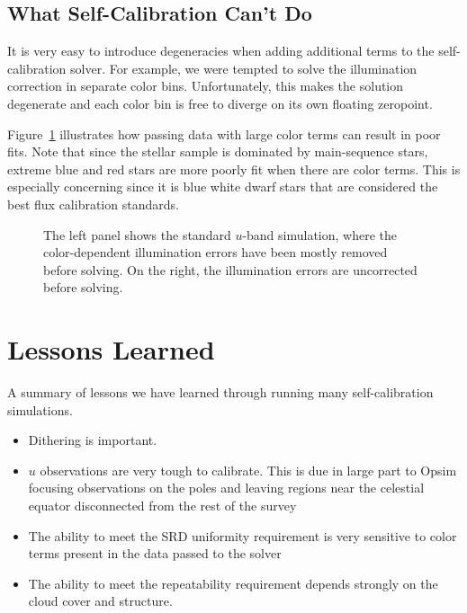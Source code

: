 \documentclass[12pt,preprint]{aastex}
\begin{document}
\subsection{What Self-Calibration Can't Do}

It is very easy to introduce degeneracies when adding additional terms to the self-calibration solver.  For example, we were tempted to solve the illumination correction in separate color bins.  Unfortunately, this makes the solution degenerate and each color bin is free to diverge on its own floating zeropoint.  

Figure~\ref{fig:badcolor} illustrates how passing data with large color terms can result in poor fits.  Note that since the stellar sample is dominated by main-sequence stars, extreme blue and red stars are more poorly fit when there are color terms.  This is especially concerning since it is blue white dwarf stars that are considered the best flux calibration standards.

\begin{figure}
\caption{The left panel shows the standard $u$-band simulation, where the color-dependent illumination errors have been mostly removed before solving.  On the right,  the illumination errors are uncorrected before solving.  \label{fig:badcolor}}
\end{figure}


\section{Lessons Learned}
A summary of lessons we have learned through running many self-calibration simulations.
\begin{itemize}
\item{Dithering is important.  }
\item{$u$ observations are very tough to calibrate.  This is due in large part to Opsim focusing observations on the poles and leaving regions near the celestial equator disconnected from the rest of the survey}
\item{The ability to meet the SRD uniformity requirement is very sensitive to color terms present in the data passed to the solver}
\item{The ability to meet the repeatability requirement depends strongly on the cloud cover and structure.  }
\end{itemize}
\end{document}
